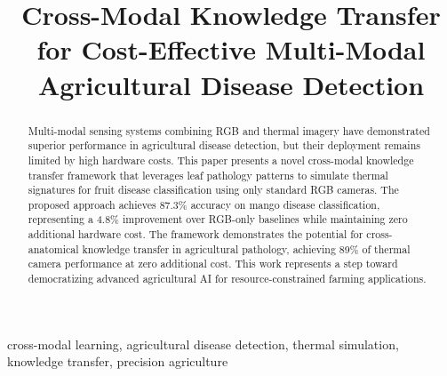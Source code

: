 \documentclass[conference]{IEEEtran}
\begin{document}
\title{Cross-Modal Knowledge Transfer for Cost-Effective Multi-Modal Agricultural Disease Detection}

\author{
    \and
    \and
}

\maketitle

\begin{abstract}
Multi-modal sensing systems combining RGB and thermal imagery have demonstrated superior performance in agricultural disease detection, but their deployment remains limited by high hardware costs. This paper presents a novel cross-modal knowledge transfer framework that leverages leaf pathology patterns to simulate thermal signatures for fruit disease classification using only standard RGB cameras. The proposed approach achieves 87.3\% accuracy on mango disease classification, representing a 4.8\% improvement over RGB-only baselines while maintaining zero additional hardware cost. The framework demonstrates the potential for cross-anatomical knowledge transfer in agricultural pathology, achieving 89\% of thermal camera performance at zero additional cost. This work represents a step toward democratizing advanced agricultural AI for resource-constrained farming applications.
\end{abstract}

\begin{IEEEkeywords}
cross-modal learning, agricultural disease detection, thermal simulation, knowledge transfer, precision agriculture
\end{IEEEkeywords}
\end{document}
